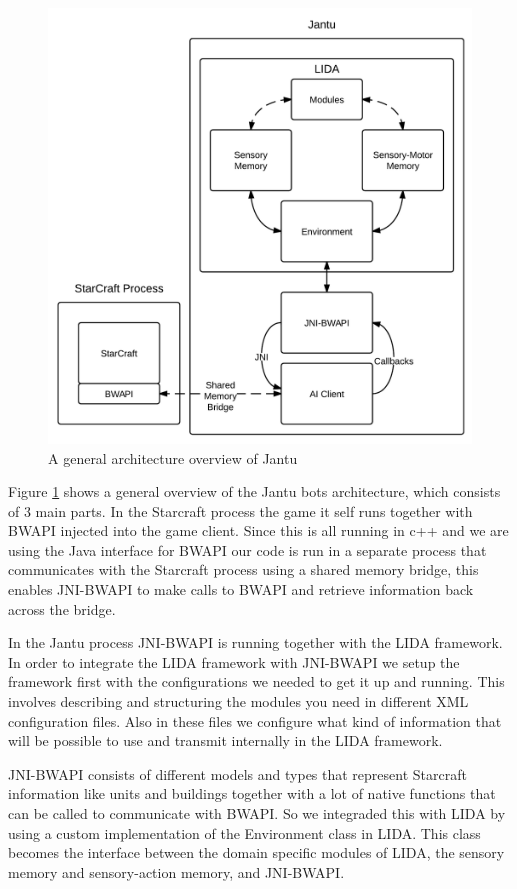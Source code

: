 \begin{figure}[h!tb]
\centering
\includegraphics[scale=1.0]{graphics/jantu.png}
\caption{A general architecture overview of Jantu}
\label{fig:jantu}
\end{figure}

Figure \ref{fig:jantu} shows a general overview of the Jantu bots architecture, which consists of 3 main parts. In the Starcraft process the game it self runs together with BWAPI injected into the game client. Since this is all running in c++ and we are using the Java interface for BWAPI our code is run in a separate process that communicates with the Starcraft process using a shared memory bridge, this enables JNI-BWAPI to make calls to BWAPI and retrieve information back across the bridge. 

In the Jantu process JNI-BWAPI is running together with the LIDA framework. In order to integrate the LIDA framework with JNI-BWAPI we setup the framework first with the configurations we needed to get it up and running. This involves describing and structuring the modules you need in different XML configuration files. Also in these files we configure what kind of information that will be possible to use and transmit internally in the LIDA framework. 

JNI-BWAPI consists of different models and types that represent Starcraft information like units and buildings together with a lot of native functions that can be called to communicate with BWAPI. So we integraded this with LIDA by using a custom implementation of the Environment class in LIDA. This class becomes the interface between the domain specific modules of LIDA, the sensory memory and sensory-action memory, and JNI-BWAPI. 


